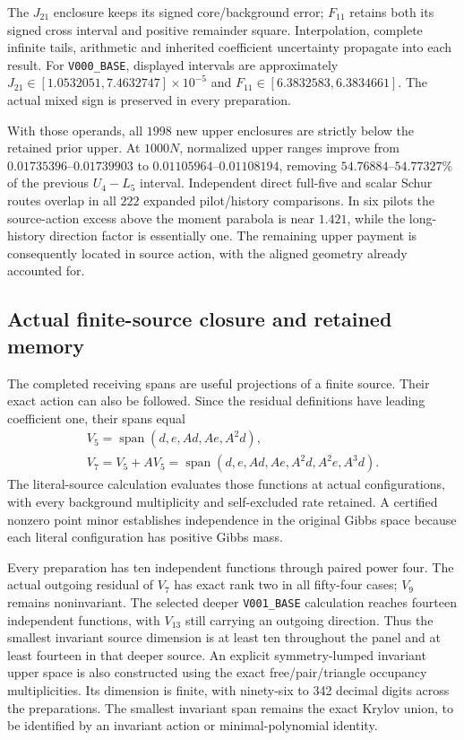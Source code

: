 The $J_{21}$ enclosure keeps its signed core/background error; $F_{11}$ retains both its signed cross interval and positive remainder square. Interpolation, complete infinite tails, arithmetic and inherited coefficient uncertainty propagate into each result. For \texttt{V000\_BASE}, displayed intervals are approximately $J_{21}\in[1.0532051,7.4632747]\times10^{-5}$ and $F_{11}\in[6.3832583,6.3834661]$. The actual mixed sign is preserved in every preparation.

With those operands, all $1998$ new upper enclosures are strictly below the retained prior upper. At $1000N$, normalized upper ranges improve from $0.01735396$--$0.01739903$ to $0.01105964$--$0.01108194$, removing $54.76884$--$54.77327\%$ of the previous $U_4-L_5$ interval. Independent direct full-five and scalar Schur routes overlap in all $222$ expanded pilot/history comparisons. In six pilots the source-action excess above the moment parabola is near $1.421$, while the long-history direction factor is essentially one. The remaining upper payment is consequently located in source action, with the aligned geometry already accounted for.

\subsection{Actual finite-source closure and retained memory}

The completed receiving spans are useful projections of a finite source. Their exact action can also be followed. Since the residual definitions have leading coefficient one, their spans equal
\[
\begin{gathered}
V_5=\operatorname{span}(d,e,Ad,Ae,A^2d),\\
V_7=V_5+AV_5
 =\operatorname{span}(d,e,Ad,Ae,A^2d,A^2e,A^3d).
\end{gathered}
\]
The literal-source calculation evaluates those functions at actual configurations, with every background multiplicity and self-excluded rate retained. A certified nonzero point minor establishes independence in the original Gibbs space because each literal configuration has positive Gibbs mass. 

Every preparation has ten independent functions through paired power four. The actual outgoing residual of $V_7$ has exact rank two in all fifty-four cases; $V_9$ remains noninvariant. The selected deeper \texttt{V001\_BASE} calculation reaches fourteen independent functions, with $V_{13}$ still carrying an outgoing direction. Thus the smallest invariant source dimension is at least ten throughout the panel and at least fourteen in that deeper source. An explicit symmetry-lumped invariant upper space is also constructed using the exact free/pair/triangle occupancy multiplicities. Its dimension is finite, with ninety-six to 342 decimal digits across the preparations. The smallest invariant span remains the exact Krylov union, to be identified by an invariant action or minimal-polynomial identity.

